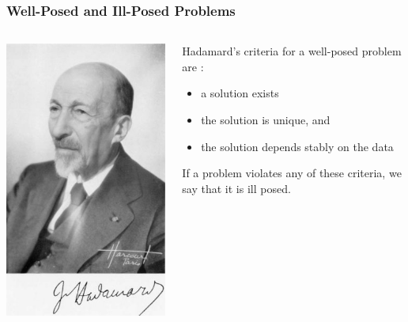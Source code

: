 \documentclass{beamer}
\begin{document}
\begin{frame}
\frametitle{Well-Posed and Ill-Posed Problems}
\begin{columns}
\begin{column}{0.4\textwidth}
\centering
\includegraphics[scale= 0.5]{media/Hadamard.jpg}
\end{column}
\begin{column}{0.6\textwidth}
Hadamard’s criteria for a well-posed problem are : 
\begin{itemize}
		 \pause
	\item a solution exists
		 \pause
	\item the solution is unique, and
		 \pause
	\item the solution depends stably on the data
\end{itemize}
		 \pause
If a problem violates any of these criteria, we say that it is ill posed.
\end{column}
\end{columns}
\end{frame}
\end{document}
